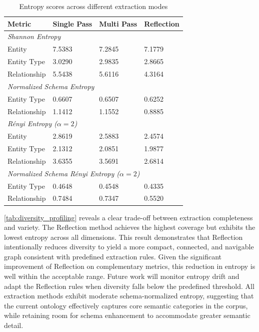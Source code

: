 \begin{table}[htbp]
\renewcommand{\arraystretch}{1.3}
\centering
\caption{Entropy scores across different extraction modes}
\label{tab:diversity_profiling}
\begin{tabularx}{\columnwidth}{l|XXX}
\hline
\textbf{Metric} & \textbf{Single Pass} & \textbf{Multi Pass} & \textbf{Reflection} \\
\hline
\multicolumn{4}{l}{\textit{Shannon Entropy}} \\
\hline
Entity & 7.5383 & 7.2845 & 7.1779 \\
Entity Type & 3.0290 & 2.9835 & 2.8665 \\
Relationship & 5.5438 & 5.6116 & 4.3164 \\
\hline
\multicolumn{4}{l}{\textit{Normalized Schema Entropy}} \\
\hline
Entity Type & 0.6607 & 0.6507 & 0.6252 \\
Relationship & 1.1412 & 1.1552 & 0.8885 \\
\hline
\multicolumn{4}{l}{\textit{Rényi Entropy ($\alpha = 2$)}} \\
\hline
Entity & 2.8619 & 2.5883 &  2.4574 \\
Entity Type & 2.1312 & 2.0851 & 1.9877 \\
Relationship & 3.6355 & 3.5691 & 2.6814\\
\hline
\multicolumn{4}{l}{\textit{Normalized Schema Rényi Entropy ($\alpha = 2$)}} \\
\hline
Entity Type & 0.4648 & 0.4548 & 0.4335 \\
Relationship & 0.7484 & 0.7347 & 0.5520 \\
\hline
\end{tabularx}
\end{table}

\autoref{tab:diversity_profiling} reveals a clear trade-off between extraction completeness and variety. The Reflection method achieves the highest coverage but exhibits the lowest entropy across all dimensions. This result demonstrates that Reflection intentionally reduces diversity to yield a more compact, connected, and navigable graph consistent with predefined extraction rules. Given the significant improvement of Reflection on complementary metrics, this reduction in entropy is well within the acceptable range. Future work will monitor entropy drift and adapt the Reflection rules when diversity falls below the predefined threshold. All extraction methods exhibit moderate schema-normalized entropy, suggesting that the current ontology effectively captures core semantic categories in the corpus, while retaining room for schema enhancement to accommodate greater semantic detail.
